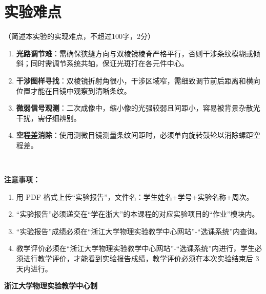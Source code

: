 \documentclass[10pt,a4paper]{ctexart}
\newcommand{\sihao}{\fontsize{14pt}{18pt}\selectfont}
\newcommand{\xiaosi}{\fontsize{12pt}{16pt}\selectfont}
\begin{document}
    
    \section{实验难点}
    
    \xiaosi（简述本实验的实现难点，不超过100字，2分）

    \begin{enumerate}    
        \item \textbf{光路调节难}：需确保狭缝方向与双棱镜棱脊严格平行，否则干涉条纹模糊或倾斜；同时需调节系统共轴，保证光斑打在各元件中心。
        \item \textbf{干涉图样寻找}：双棱镜折射角很小，干涉区域窄，需细致调节前后距离和横向位置才能在目镜中观察到清晰条纹。
        \item \textbf{微弱信号观测}：二次成像中，缩小像的光强较弱且间距小，容易被背景杂散光干扰，需仔细辨别。
        \item \textbf{空程差消除}：使用测微目镜测量条纹间距时，必须单向旋转鼓轮以消除螺距空程差。
    \end{enumerate}  \



\newpage

\sihao\textbf{注意事项：}
\xiaosi
\begin{enumerate}
    \item  用 PDF 格式上传“实验报告”，文件名：学生姓名+学号+实验名称+周次。
    \item  “实验报告”必须递交在“学在浙大”的本课程的对应实验项目的“作业”模块内。
    \item  “实验报告”成绩必须在“浙江大学物理实验教学中心网站”-“选课系统”内查询。
    \item 教学评价必须在“浙江大学物理实验教学中心网站”-“选课系统”内进行，学生必须进行教学评价，才能看到实验报告成绩，教学评价必须在本次实验结束后 3 天内进行。
\end{enumerate}

\vspace{1cm}
\xiaosi\centering \textbf{浙江大学物理实验教学中心制}
\end{document}
